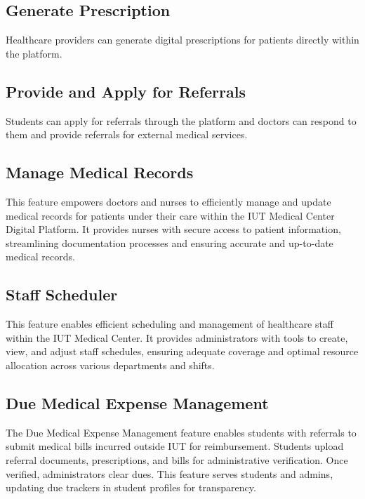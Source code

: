 \documentclass[11.5pt]{article}
\begin{document}
	
	\subsection{Generate Prescription}
	
	Healthcare providers can generate digital prescriptions for patients directly within the platform.
	
	\subsection{Provide and Apply for Referrals}
	Students can apply for referrals through the platform and doctors can respond to them and provide referrals for external medical services.
	
	
	\subsection{Manage Medical Records}
	This feature empowers doctors and nurses to efficiently manage and update medical records for patients under their care within the IUT Medical Center Digital Platform. It provides nurses with secure access to patient information, streamlining documentation processes and ensuring accurate and up-to-date medical records.
	
	
	\subsection{Staff Scheduler}
	This feature enables efficient scheduling and management of healthcare staff within the IUT Medical Center. It provides administrators with tools to create, view, and adjust staff schedules, ensuring adequate coverage and optimal resource allocation across various departments and shifts.
	
	
	\subsection{Due Medical Expense Management}
	
	The Due Medical Expense Management feature enables students with referrals to submit medical bills incurred outside IUT for reimbursement. Students upload referral documents, prescriptions, and bills for administrative verification. Once verified, administrators clear dues. This feature serves students and admins, updating due trackers in student profiles for transparency.
	
	
	
\end{document}
